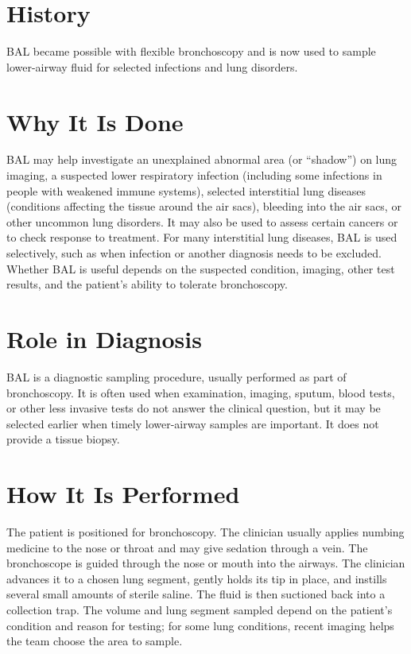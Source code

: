 \section*{History}
BAL became possible with flexible bronchoscopy and is now used to sample lower-airway fluid for selected infections and lung disorders.

\section*{Why It Is Done}
BAL may help investigate an unexplained abnormal area (or “shadow”) on lung imaging, a suspected lower respiratory infection (including some infections in people with weakened immune systems), selected interstitial lung diseases (conditions affecting the tissue around the air sacs), bleeding into the air sacs, or other uncommon lung disorders. It may also be used to assess certain cancers or to check response to treatment. For many interstitial lung diseases, BAL is used selectively, such as when infection or another diagnosis needs to be excluded. Whether BAL is useful depends on the suspected condition, imaging, other test results, and the patient's ability to tolerate bronchoscopy.

\section*{Role in Diagnosis}
BAL is a diagnostic sampling procedure, usually performed as part of bronchoscopy. It is often used when examination, imaging, sputum, blood tests, or other less invasive tests do not answer the clinical question, but it may be selected earlier when timely lower-airway samples are important. It does not provide a tissue biopsy.

\section*{How It Is Performed}
The patient is positioned for bronchoscopy. The clinician usually applies numbing medicine to the nose or throat and may give sedation through a vein. The bronchoscope is guided through the nose or mouth into the airways. The clinician advances it to a chosen lung segment, gently holds its tip in place, and instills several small amounts of sterile saline. The fluid is then suctioned back into a collection trap. The volume and lung segment sampled depend on the patient's condition and reason for testing; for some lung conditions, recent imaging helps the team choose the area to sample.

